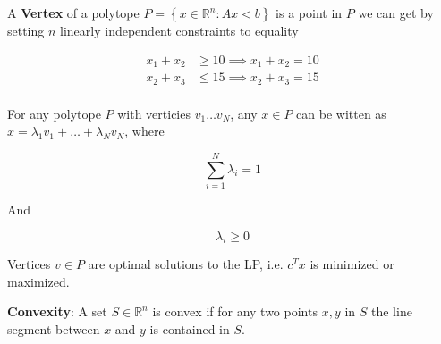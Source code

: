\documentclass[../notes.tex]{subfiles}
\begin{document}
\begin{definition}
    A \textbf{Vertex} of a polytope $ P = \left\{ x \in \mathbb{R}^n : Ax < b \right\}  $  is a point in $ P $ we  can get by setting $ n $ linearly independent constraints to equality

    \begin{equation}
        \begin{split}
            x_1 + x_2 &\ge 10 \implies x_1 + x_2 = 10  \\
             x_2 + x_3 &\le 15 \implies x_2 + x_3 = 15 \\
        \end{split}
    \end{equation}

\end{definition}

\begin{theorem}
    For any polytope $ P $ with verticies $ v_1 \ldots v_N $, any $ x \in P $ can be witten as $ x = \lambda_1 v_1 + \ldots + \lambda_N v_N $, where

    \begin{equation}
        \sum_{i=1}^N \lambda_i = 1
    \end{equation}

    And

    \begin{equation}
        \lambda_i \ge 0
    \end{equation}

\end{theorem}


\begin{theorem}
    Vertices $ v \in P $ are optimal solutions to the LP, i.e. $ c^Tx$  is minimized or maximized.
\end{theorem}





\begin{definition}
    \textbf{Convexity}: A set $ S \in \mathbb{R}^n $ is convex if for any two points $ x, y $ in $ S $ the line segment between $ x $ and $ y $ is contained in $ S $.
\end{definition}
\end{document}
